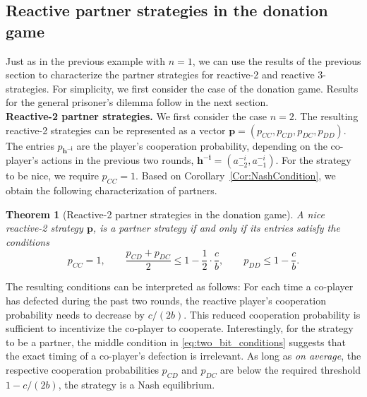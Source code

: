 \documentclass[9pt,twoside,lineno]{pnas-new}
\theoremstyle{plainCl1}
\newtheorem{theorem}{Theorem}
\theoremstyle{plainCl2}
\begin{document}

\subsection{Reactive partner strategies in the donation game}\label{section:reactive_strategies}

Just as in the previous example with $n\!=\!1$, we can use the results of the previous section to characterize the partner strategies for reactive-2 and reactive 3-strategies. 
For simplicity, we first consider the case of the donation game. Results for the general prisoner's dilemma follow in the next section.\\ 

\noindent
{\bf Reactive-2 partner strategies.}
We first consider the case $n\!=\!2$. 
The resulting reactive-2 strategies can be represented as a vector
$\mathbf{p}=(p_{CC}, p_{CD}, p_{DC}, p_{DD})$. 
The entries $p_\mathbf{h^{-i}}$ are the player's cooperation probability, depending on the co-player's actions in the previous two rounds, $\mathbf{h^{-i}}\!=\!(a^{-i}_{-2},a^{-i}_{-1})$. 
For the strategy to be nice, we require $p_{CC}\!=\!1$. 
Based on Corollary~\ref{Cor:NashCondition}, we obtain the following characterization of partners. 

\begin{theorem}[Reactive-2 partner strategies in the donation game]\label{theorem:reactive_two_partner_strategies}
A nice reactive-2 strategy $\mathbf{p}$, is a partner strategy if and only if its entries satisfy the conditions
\begin{equation}\label{eq:two_bit_conditions}
  p_{CC} \!=\! 1, \qquad \displaystyle \frac{p_{CD} \!+\! p_{DC}}{2} \!\le\! 1 \!-\! \frac{1}{2} \cdot \frac{c}{b}, \qquad p_{DD} \le 1\!-\! \frac{c}{b}.
\end{equation}
\end{theorem}

\noindent
The resulting conditions can be interpreted as follows: For each time a co-player has defected during the past two rounds, the reactive player's cooperation probability needs to decrease by $c/(2b)$. 
This reduced cooperation probability is sufficient to incentivize the co-player to cooperate. 
Interestingly, for the strategy to be a partner, the middle condition in \eqref{eq:two_bit_conditions} suggests that the exact timing of a co-player's defection is irrelevant. 
As long as {\it on average}, the respective cooperation probabilities $p_{CD}$ and $p_{DC}$ are below the required threshold $1\!-\!c/(2b)$, the strategy is a Nash equilibrium. 
\end{document}
